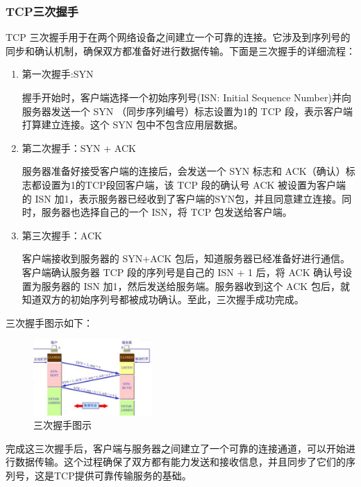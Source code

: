 \documentclass[UTF8,a4paper,10pt]{ctexart}
\begin{document}
\subsubsection{TCP三次握手}
TCP 三次握手用于在两个网络设备之间建立一个可靠的连接。它涉及到序列号的同步和确认机制，确保双方都准备好进行数据传输。下面是三次握手的详细流程：
\begin{enumerate}

\item 第一次握手:SYN\par
握手开始时，客户端选择一个初始序列号(ISN: Initial Sequence Number)并向服务器发送一个 SYN （同步序列编号）标志设置为1的 TCP 段，表示客户端打算建立连接。这个 SYN 包中不包含应用层数据。

\item 第二次握手：SYN + ACK \par
服务器准备好接受客户端的连接后，会发送一个 SYN 标志和 ACK（确认）标志都设置为1的TCP段回客户端，该 TCP 段的确认号 ACK 被设置为客户端的 ISN 加1，表示服务器已经收到了客户端的SYN包，并且同意建立连接。同时，服务器也选择自己的一个 ISN，将 TCP 包发送给客户端。 

\item 第三次握手：ACK \par
客户端接收到服务器的 SYN+ACK 包后，知道服务器已经准备好进行通信。客户端确认服务器 TCP 段的序列号是自己的 ISN + 1 后，将 ACK 确认号设置为服务器的 ISN 加1，然后发送给服务端。服务器收到这个 ACK 包后，就知道双方的初始序列号都被成功确认。至此，三次握手成功完成。

\end{enumerate}
三次握手图示如下：
\begin{figure}[H]
    \centering
\includegraphics[width=0.4\textwidth]{img/三次握手图示.png}
    \caption{三次握手图示}
\end{figure}

完成这三次握手后，客户端与服务器之间建立了一个可靠的连接通道，可以开始进行数据传输。这个过程确保了双方都有能力发送和接收信息，并且同步了它们的序列号，这是TCP提供可靠传输服务的基础。
\end{document}
